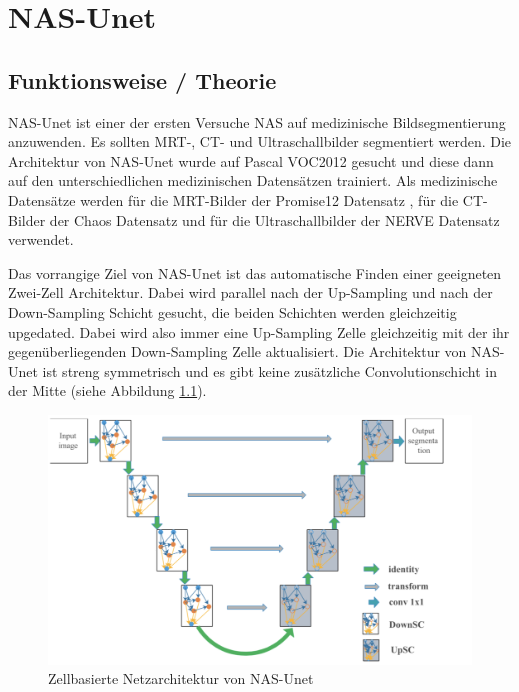 \chapter{NAS-Unet}
\label{ch:nasunet}




\section{Funktionsweise / Theorie}


NAS-Unet ist einer der ersten Versuche NAS auf medizinische Bildsegmentierung anzuwenden. Es sollten MRT-, CT- und Ultraschallbilder segmentiert werden. Die Architektur von NAS-Unet wurde auf Pascal VOC2012 \cite{PascalVOCDatensatz} gesucht und diese dann auf den unterschiedlichen medizinischen Datensätzen trainiert. Als medizinische Datensätze werden für die MRT-Bilder der Promise12 Datensatz \cite{Promise12Datensatz}, für die CT-Bilder der Chaos Datensatz \cite{ChaosDatensatz} und für die Ultraschallbilder der NERVE Datensatz \cite{NerveDatensatz} verwendet. 

Das vorrangige Ziel von NAS-Unet ist das automatische Finden einer geeigneten Zwei-Zell Architektur. Dabei wird parallel nach der Up-Sampling und nach der Down-Sampling Schicht gesucht, die beiden Schichten werden gleichzeitig upgedated. Dabei wird also immer eine Up-Sampling Zelle gleichzeitig mit der ihr gegenüberliegenden Down-Sampling Zelle aktualisiert. Die Architektur von NAS-Unet ist streng symmetrisch und es gibt keine zusätzliche Convolutionschicht in der Mitte (siehe Abbildung \ref{pic:nasUnet_ArchitekturGesamt}). 

\begin{figure}[H]
	
	\centering
	\includegraphics[scale=0.5]{Pictures/nasUnet/Bild1.png}
	\caption{Zellbasierte Netzarchitektur von NAS-Unet \cite{nasunetPaper} }
	\label{pic:nasUnet_ArchitekturGesamt}
\end{figure}

